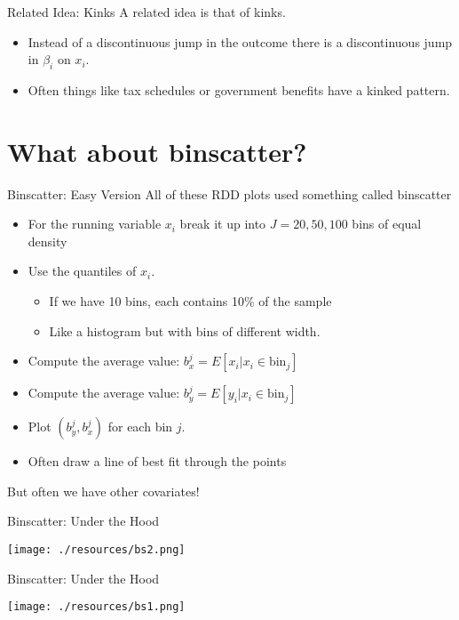 \documentclass[xcolor=pdftex,dvipsnames,table,mathserif,aspectratio=169]{beamer}
\begin{document}
\begin{frame}{Related Idea: Kinks}
 A related idea is that of \alert{kinks}. 
\begin{itemize}
\item Instead of a discontinuous jump in the outcome there is a discontinuous jump in $\beta_i$ on $x_i$.
\item Often things like tax schedules or government benefits have a kinked pattern.
\end{itemize}
\end{frame}

\section{What about binscatter?}

\begin{frame}{Binscatter: Easy Version}
All of these RDD plots used something called \alert{binscatter}
\begin{itemize}
\item For the running variable $x_i$ break it up into $J=20,50,100$ bins of equal \alert{density}
\item Use the \alert{quantiles} of $x_i$.
\begin{itemize}
\item If we have 10 bins, each contains 10\% of the sample
\item Like a histogram but with \alert{bins of different width}.
\end{itemize}
\item Compute the average value:  $b_x^j=E[x_i | x_i \in \text{bin}_j]$
\item Compute the average value:  $b_y^j=E[y_i | x_i \in \text{bin}_j]$
\item Plot $(b_y^j,b_x^j)$ for each bin $j$.
\item Often draw a line of best fit through the points
\end{itemize}
But often we have other covariates!
\end{frame}


\begin{frame}{Binscatter: Under the Hood}
\begin{center}
\texttt{[image: ./resources/bs2.png]}
\end{center}
\end{frame}


\begin{frame}{Binscatter: Under the Hood}
\begin{center}
\texttt{[image: ./resources/bs1.png]}
\end{center}
\end{frame}
\end{document}
